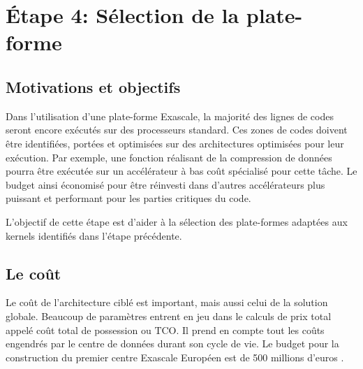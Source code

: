 
\section{Étape 4: Sélection de la plate-forme}


\subsection{Motivations et objectifs}


Dans l'utilisation d'une plate-forme Exascale, la majorité des lignes de codes seront encore exécutés sur des processeurs standard. Ces zones de codes doivent être identifiées, portées et optimisées sur des architectures optimisées pour leur exécution. Par exemple, une fonction réalisant de la compression de données pourra être exécutée sur un accélérateur à bas coût spécialisé pour cette tâche. Le budget ainsi économisé pour être réinvesti dans d'autres accélérateurs plus puissant et performant pour les parties critiques du code. 

L'objectif de cette étape est d'aider à la sélection des plate-formes adaptées aux kernels identifiés dans l'étape précédente.


\subsection{Le coût}

Le coût de l'architecture ciblé est important, mais aussi celui de la solution globale. Beaucoup de paramètres entrent en jeu dans le calculs de prix total appelé coût total de possession ou $\text{TCO}$. Il prend en compte tout les coûts engendrés par le centre de données durant son cycle de vie. Le budget pour la construction du premier centre Exascale Européen est de 500 millions d'euros \cite{SergiGirona2018}.

